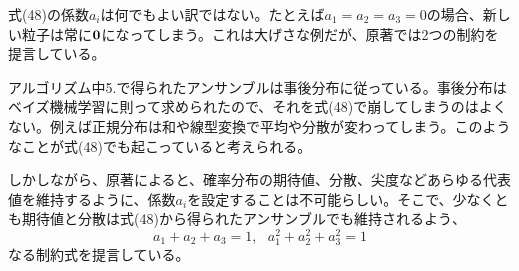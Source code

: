 \documentclass[dvipdfmx, 9pt, a4paper]{jsarticle}
\newcommand{\bm}[1]{{\mbox{\boldmath $#1$}}}
\begin{document}
式(48)の係数$a_i$は何でもよい訳ではない。たとえば$a_1=a_2=a_3=0$の場合、新しい粒子は常に$\bm 0$になってしまう。これは大げさな例だが、原著では2つの制約を提言している。\par
アルゴリズム中5.で得られたアンサンブルは事後分布に従っている。事後分布はベイズ機械学習に則って求められたので、それを式(48)で崩してしまうのはよくない。例えば正規分布は和や線型変換で平均や分散が変わってしまう。このようなことが式(48)でも起こっていると考えられる。\par
しかしながら、原著によると、確率分布の期待値、分散、尖度などあらゆる代表値を維持するように、係数$a_i$を設定することは不可能らしい。そこで、少なくとも期待値と分散は式(48)から得られたアンサンブルでも維持されるよう、
\begin{equation}
a_1+a_2+a_3=1,~~~a_1^2+a_2^2+a_3^2=1
\end{equation}
なる制約式を提言している。
\end{document}

